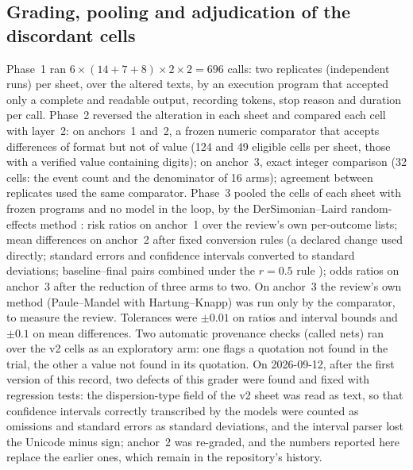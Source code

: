 \documentclass[11pt]{article}
\begin{document}
\subsection{Grading, pooling and adjudication of the discordant cells}
\label{sec:grading}
Phase~1 ran $6 \times (14+7+8) \times 2 \times 2 = 696$ calls: two replicates (independent runs) per sheet, over the altered texts, by an execution program that accepted only a complete and readable output, recording tokens, stop reason and duration per call. Phase~2 reversed the alteration in each sheet and compared each cell with layer~2: on anchors~1 and~2, a frozen numeric comparator that accepts differences of format but not of value (124 and 49 eligible cells per sheet, those with a verified value containing digits); on anchor~3, exact integer comparison (32 cells: the event count and the denominator of 16 arms); agreement between replicates used the same comparator. Phase~3 pooled the cells of each sheet with frozen programs and no model in the loop, by the DerSimonian--Laird random-effects method \citep{dersimonian1986meta}: risk ratios on anchor~1 over the review's own per-outcome lists; mean differences on anchor~2 after fixed conversion rules (a declared change used directly; standard errors and confidence intervals converted to standard deviations; baseline--final pairs combined under the $r=0.5$ rule \citep{higgins2023handbook}); odds ratios on anchor~3 after the reduction of three arms to two. On anchor~3 the review's own method (Paule--Mandel with Hartung--Knapp) was run only by the comparator, to measure the review. Tolerances were $\pm0.01$ on ratios and interval bounds and $\pm0.1$ on mean differences. Two automatic provenance checks (called nets) ran over the v2 cells as an exploratory arm: one flags a quotation not found in the trial, the other a value not found in its quotation. On 2026-09-12, after the first version of this record, two defects of this grader were found and fixed with regression tests: the dispersion-type field of the v2 sheet was read as text, so that confidence intervals correctly transcribed by the models were counted as omissions and standard errors as standard deviations, and the interval parser lost the Unicode minus sign; anchor~2 was re-graded, and the numbers reported here replace the earlier ones, which remain in the repository's history.
\end{document}
